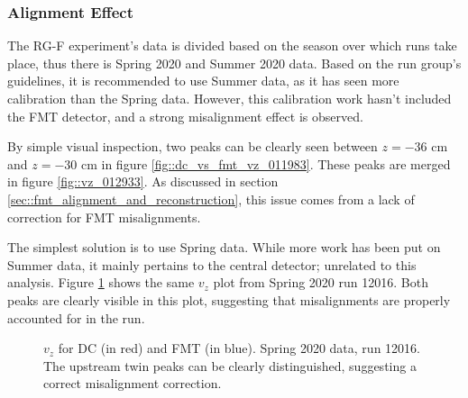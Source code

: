 \subsubsection{Alignment Effect}
    The RG-F experiment's data is divided based on the season over which runs take place, thus there is Spring 2020 and Summer 2020 data.
    Based on the run group's guidelines, it is recommended to use Summer data, as it has seen more calibration than the Spring data.
    However, this calibration work hasn't included the FMT detector, and a strong misalignment effect is observed.

    By simple visual inspection, two peaks can be clearly seen between $z = -36$ cm and $z = -30$ cm in figure \ref{fig::dc_vs_fmt_vz_011983}.
    These peaks are merged in figure \ref{fig::vz_012933}.
    As discussed in section \ref{sec::fmt_alignment_and_reconstruction}, this issue comes from a lack of correction for FMT misalignments.

    The simplest solution is to use Spring data.
    While more work has been put on Summer data, it mainly pertains to the central detector; unrelated to this analysis.
    Figure \ref{fig::vz_012016} shows the same $v_z$ plot from Spring 2020 run 12016.
    Both peaks are clearly visible in this plot, suggesting that misalignments are properly accounted for in the run.

    \begin{figure}[t!]
        \centering{}
        \caption[$v_z$ for DC and FMT, run 12016]{$v_z$ for DC (in red) and FMT (in blue). Spring 2020 data, run 12016. The upstream twin peaks can be clearly distinguished, suggesting a correct misalignment correction.}
        \label{fig::vz_012016}
    \end{figure}
